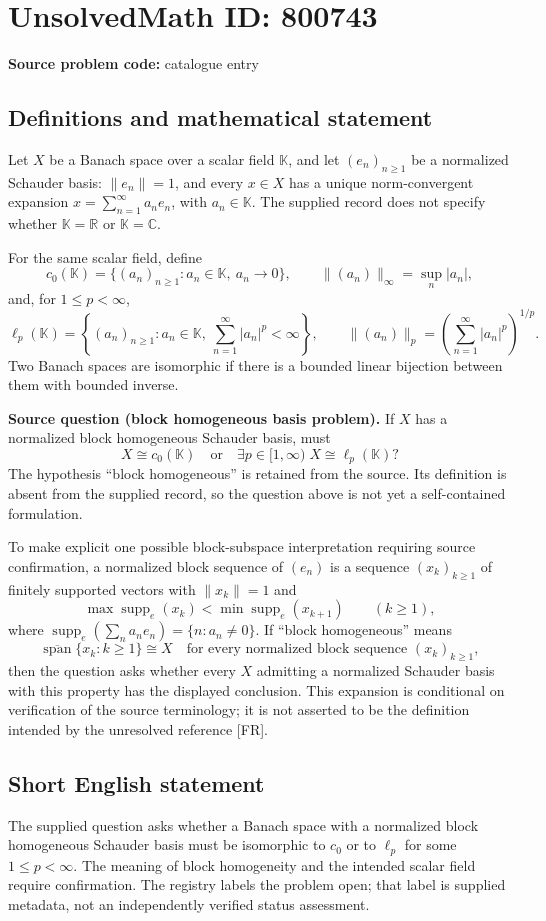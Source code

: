 \documentclass[11pt]{article}
\newcommand{\R}{\mathbb{R}}
\newcommand{\C}{\mathbb{C}}
\begin{document}
\section*{UnsolvedMath ID: 800743}
\textbf{Source problem code:} catalogue entry
\subsection{Definitions and mathematical statement}
Let \(X\) be a Banach space over a scalar field \(\mathbb K\), and let \((e_n)_{n\geq 1}\) be a normalized Schauder basis: \(\|e_n\|=1\), and every \(x\in X\) has a unique norm-convergent expansion \(x=\sum_{n=1}^{\infty}a_ne_n\), with \(a_n\in\mathbb K\). The supplied record does not specify whether \(\mathbb K=\R\) or \(\mathbb K=\C\).

For the same scalar field, define
\[
c_0(\mathbb K)=\{(a_n)_{n\geq1}:a_n\in\mathbb K,\ a_n\to0\},\qquad \|(a_n)\|_\infty=\sup_n|a_n|,
\]
and, for \(1\leq p<\infty\),
\[
\ell_p(\mathbb K)=\left\{(a_n)_{n\geq1}:a_n\in\mathbb K,\ \sum_{n=1}^{\infty}|a_n|^p<\infty\right\},\qquad
\|(a_n)\|_p=\left(\sum_{n=1}^{\infty}|a_n|^p\right)^{1/p}.
\]
Two Banach spaces are isomorphic if there is a bounded linear bijection between them with bounded inverse.

\textbf{Source question (block homogeneous basis problem).} If \(X\) has a normalized block homogeneous Schauder basis, must
\[
X\cong c_0(\mathbb K)\quad\text{or}\quad \exists p\in[1,\infty)\; X\cong\ell_p(\mathbb K)?
\]
The hypothesis ``block homogeneous'' is retained from the source. Its definition is absent from the supplied record, so the question above is not yet a self-contained formulation.

To make explicit one possible block-subspace interpretation requiring source confirmation, a normalized block sequence of \((e_n)\) is a sequence \((x_k)_{k\geq1}\) of finitely supported vectors with \(\|x_k\|=1\) and
\[
\max\operatorname{supp}_{e}(x_k)<\min\operatorname{supp}_{e}(x_{k+1})\qquad(k\geq1),
\]
where \(\operatorname{supp}_{e}(\sum_n a_ne_n)=\{n:a_n\ne0\}\). If ``block homogeneous'' means
\[
\overline{\operatorname{span}}\{x_k:k\geq1\}\cong X
\quad\text{for every normalized block sequence }(x_k)_{k\geq1},
\]
then the question asks whether every \(X\) admitting a normalized Schauder basis with this property has the displayed conclusion. This expansion is conditional on verification of the source terminology; it is not asserted to be the definition intended by the unresolved reference [FR].
\subsection{Short English statement}
The supplied question asks whether a Banach space with a normalized block homogeneous Schauder basis must be isomorphic to \(c_0\) or to \(\ell_p\) for some \(1\leq p<\infty\). The meaning of block homogeneity and the intended scalar field require confirmation. The registry labels the problem open; that label is supplied metadata, not an independently verified status assessment.
\end{document}
